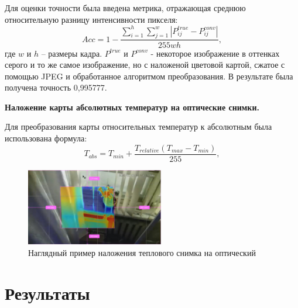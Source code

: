 \documentclass[t]{beamer}
\begin{document}
	\begin{frame}
		Для оценки точности была введена метрика, отражающая среднюю относительную разницу интенсивности пикселя:
		\begin{equation*}
			Acc = 1 - \frac{\sum\limits_{i=1}^h \sum\limits_{j=1}^w |P^{true}_{ij} - P^{conv}_{ij}|}{255wh},
			\label{eq:flanaccuracy}
		\end{equation*}
		где $w$ и $h$ -- размеры кадра. $P^{true}$ и $P^{conv}$ - некоторое изображение в оттенках серого и то же самое изображение, но с наложеной цветовой картой, сжатое с помощью JPEG и обработанное алгоритмом преобразования. В результате была получена точность 0,995777.
	\end{frame}

	\begin{frame}
		\bfseries Наложение карты абсолютных температур на оптические снимки. \normalfont
		
		Для преобразования карты относительных температур к абсолютным была использована формула:
		\begin{equation*}
			T_{abs} = T_{min} + \frac{T_{relative}(T_{max} - T_{min})}{255},
			\label{eq:Cjetgray}
		\end{equation*}
		\begin{figure}[h!]
			\centering
			\includegraphics[width = 6cm]{image/tep+opt}	
			\caption{Наглядный пример наложения теплового снимка на оптический}
			\label{fig:tep+opt}
		\end{figure}
	\end{frame}

\section{Результаты}
\end{document}
